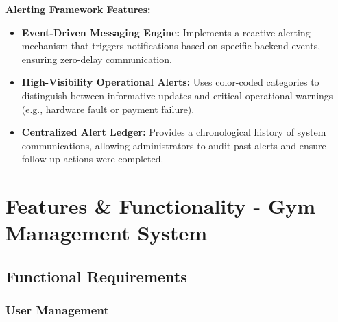 \documentclass[
  12pt,
  a4paperpaper,
]{report}
\begin{document}
\vspace{0.15cm}

\noindent\textbf{Alerting Framework Features:}
\begin{itemize}
    \item \textbf{Event-Driven Messaging Engine:} Implements a reactive alerting mechanism that triggers notifications based on specific backend events, ensuring zero-delay communication.
    \item \textbf{High-Visibility Operational Alerts:} Uses color-coded categories to distinguish between informative updates and critical operational warnings (e.g., hardware fault or payment failure).
    \item \textbf{Centralized Alert Ledger:} Provides a chronological history of system communications, allowing administrators to audit past alerts and ensure follow-up actions were completed.
\end{itemize}



\chapter{Features \& Functionality - Gym Management
System}\label{features-functionality---gym-management-system}

\section{Functional Requirements}\label{functional-requirements}

\subsection{User Management}\label{user-management}
\end{document}
